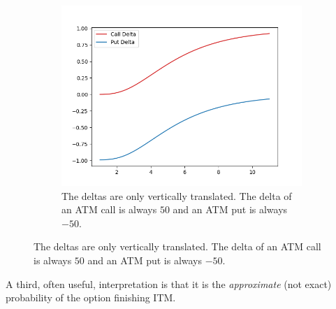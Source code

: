\documentclass{article}
\begin{document}
\begin{definition}[Delta]
\begin{figure}[H]
\begin{subfigure}[b]{0.48\textwidth}
          \includegraphics[width=\textwidth]{img/call_put_delta.png}
          \caption{The deltas are only vertically translated. The delta of an ATM call is always $50$ and an ATM put is always $-50$. }
          \label{fig:call_put_delta}
        \end{subfigure}
        \label{fig:theo_vs_delta}
      \end{figure}
      A third, often useful, interpretation is that it is the \textit{approximate} (not exact) probability of the option finishing ITM. 
    \end{definition}
\end{document}
